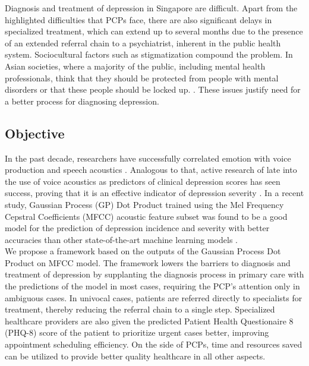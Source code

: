 \documentclass{article}
\begin{document}
    Diagnosis and treatment of depression in Singapore are difficult. Apart from the highlighted difficulties that PCPs face, there are also significant delays in specialized treatment, which can extend up to several months due to the presence of an extended referral chain to a psychiatrist, inherent in the public health system. Sociocultural factors such as stigmatization compound the problem. In Asian societies, where a majority of the public, including mental health professionals, think that they should be protected from people with mental disorders or that these people should be locked up. \cite{chong2009}. These issues justify need for a better process for diagnosing depression. \\
    
    \subsection{Objective}
    In the past decade, researchers have successfully correlated emotion with voice production and speech acoustics \cite{uwa2001}. 
    Analogous to that, active research of late into the use of voice acoustics as predictors of clinical depression scores has seen success, proving that it is an effective indicator of depression severity \cite{jov2016}. In a recent study, Gaussian Process (GP) Dot Product trained using the Mel Frequency Cepstral Coefficients (MFCC) acoustic feature subset was found to be a good model for the prediction of depression incidence and severity with better accuracies than other state-of-the-art machine learning models \cite{cs42462016}.\\

    We propose a framework based on the outputs of the Gaussian Process Dot Product on MFCC model. The framework lowers the barriers to diagnosis and treatment of depression by supplanting the diagnosis process in primary care with the predictions of the model in most cases, requiring the PCP's attention only in ambiguous cases. In univocal cases, patients are referred directly to specialists for treatment, thereby reducing the referral chain to a single step. Specialized healthcare providers are also given the predicted Patient Health Questionaire 8 (PHQ-8) score of the patient to prioritize urgent cases better, improving appointment scheduling efficiency. On the side of PCPs, time and resources saved can be utilized to provide better quality healthcare in all other aspects.
    
\end{document}
